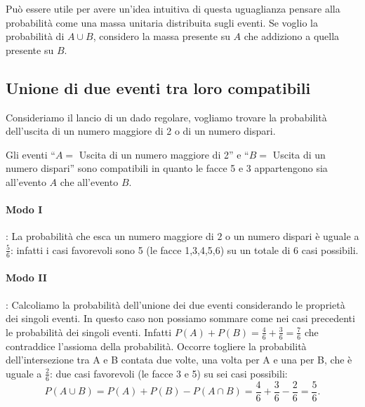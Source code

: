 Può essere utile per avere un'idea intuitiva di questa uguaglianza pensare 
alla 
probabilità come una massa unitaria distribuita sugli eventi. Se voglio la 
probabilità di $A\cup B$, considero la massa presente su $A$ che addiziono 
a 
quella presente su $B$.

\subsection{Unione di due eventi tra loro compatibili}

\begin{esempio}
Consideriamo il lancio di un dado regolare, vogliamo trovare la probabilità 
dell'uscita di un numero maggiore di 2 o di un numero dispari.

Gli eventi ``$ A= $ Uscita di un numero maggiore di 2'' e ``$ B= $ Uscita 
di un 
numero dispari'' sono compatibili in quanto le facce 5 e 3 appartengono sia 
all'evento $A$ che all'evento $B$.
\begin{center}
 
\end{center}
\paragraph{Modo I}: La probabilità che esca un numero maggiore di $2$ o un 
numero dispari è uguale a $\frac 5 6$: infatti i casi favorevoli sono 5 (le 
facce 1,3,4,5,6) su un totale di $6$ casi possibili.
\paragraph{Modo II}: Calcoliamo la probabilità dell'unione dei due eventi 
considerando le proprietà dei singoli eventi. In questo caso non possiamo 
sommare come nei casi precedenti le probabilità dei singoli eventi. Infatti 
$P(A)+P(B)=\frac 4 6+\frac 3 6=\frac 7 6$ che contraddice l'assioma della 
probabilità. Occorre togliere la probabilità dell'intersezione tra A e B 
contata 
due volte, una volta per A e una per B, che è uguale a $\frac 2 6$: due 
casi 
favorevoli (le facce 3 e 5) su sei casi possibili: \[P(A\cup 
B)=P(A)+P(B)-P(A\cap B)=\frac 4 6+\frac 3 6-\frac 2 6=\frac 5 6.\]
\end{esempio}

